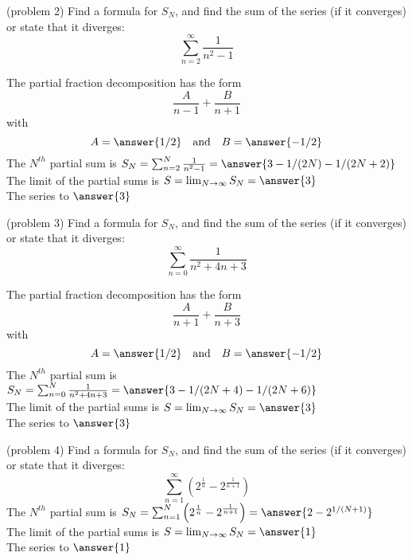 \documentclass[handout]{ximera}
\begin{document}
\begin{problem}(problem 2)
Find a formula for $S_N$, and find the sum of the series (if it converges) or state that it diverges:
\[
\sum_{n=2}^\infty \frac{1}{n^2 - 1}    
\]

The partial fraction decomposition has the form
\[
\frac{A}{n-1} + \frac{B}{n+1}
\]
with 
\[
A = \answer{1/2} \quad \mbox{and} \quad B = \answer{-1/2}
\]
The $N^{th}$ partial sum is  $S_N = \sum_{n=2}^N \frac{1}{n^2 - 1} =  \answer{3 - 1/(2N) - 1/(2N+2)}$\\
The limit of the partial sums is $S = \lim_{N\to \infty}S_N = \answer{3}$\\
The series  to $\answer{3}$

\end{problem}

\begin{problem}(problem 3)
Find a formula for $S_N$, and find the sum of the series (if it converges) or state that it diverges:
\[
\sum_{n=0}^\infty \frac{1}{n^2 + 4n + 3}    
\]

The partial fraction decomposition has the form
\[
\frac{A}{n+1} + \frac{B}{n+3}
\]
with 
\[
A = \answer{1/2} \quad \mbox{and} \quad B = \answer{-1/2}
\]
The $N^{th}$ partial sum is  $S_N = \sum_{n=0}^N \frac{1}{n^2 + 4n + 3} =  \answer{3 -  1/(2N+4)-  1/(2N+6)}$\\
The limit of the partial sums is $S = \lim_{N\to \infty}S_N = \answer{3}$\\
The series  to $\answer{3}$

\end{problem}


\begin{problem}(problem 4)
Find a formula for $S_N$, and find the sum of the series (if it converges) or state that it diverges:
\[
\sum_{n=1}^\infty \left( 2^{\frac{1}{n}} - 2^{\frac{1}{n+1}}\right) 
\]
The $N^{th}$ partial sum is  $S_N = \sum_{n=1}^N \left( 2^{\frac{1}{n}} - 2^{\frac{1}{n+1}}\right) =  \answer{2 - 2^{1/(N+1)}}$\\
The limit of the partial sums is $S = \lim_{N\to \infty}S_N = \answer{1}$\\
The series  to $\answer{1}$

\end{problem}
\end{document}
